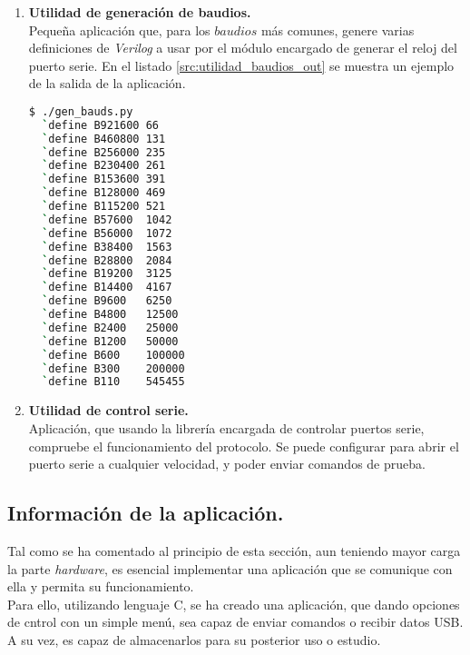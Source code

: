 \begin{enumerate}
    \item \textbf{Utilidad de generación de baudios.} \\
    Pequeña aplicación que, para los $baudios$ más comunes, genere varias definiciones de \emph{Verilog} a usar por el módulo encargado de generar el reloj del puerto serie. En el listado \ref{src:utilidad_baudios_out} se muestra un ejemplo de la salida de la aplicación.
    \\ 
    \begin{lstlisting}[language=bash,
        caption={Ejemplo de la utilidad de generación de baudios ante \emph{60 MHz} de entrada.},
        label=src:utilidad_baudios_out]
$ ./gen_bauds.py
  `define B921600 66
  `define B460800 131
  `define B256000 235
  `define B230400 261
  `define B153600 391
  `define B128000 469
  `define B115200 521
  `define B57600  1042
  `define B56000  1072
  `define B38400  1563
  `define B28800  2084
  `define B19200  3125
  `define B14400  4167
  `define B9600   6250
  `define B4800   12500
  `define B2400   25000
  `define B1200   50000
  `define B600    100000
  `define B300    200000
  `define B110    545455
    \end{lstlisting}
    
    \item \textbf{Utilidad de control serie.} \\
    Aplicación, que usando la librería encargada de controlar puertos serie, compruebe el funcionamiento del protocolo. Se puede configurar para abrir el puerto serie a cualquier velocidad, y poder enviar comandos de prueba.
\end{enumerate}

\subsection{Información de la aplicación.}
Tal como se ha comentado al principio de esta sección, aun teniendo mayor carga la parte \emph{hardware}, es esencial implementar una aplicación que se comunique con ella y permita su funcionamiento. \\
Para ello, utilizando lenguaje C, se ha creado una aplicación, que dando opciones de cntrol con un simple menú, sea capaz de enviar comandos o recibir datos USB. A su vez, es capaz de almacenarlos para su posterior uso o estudio.


